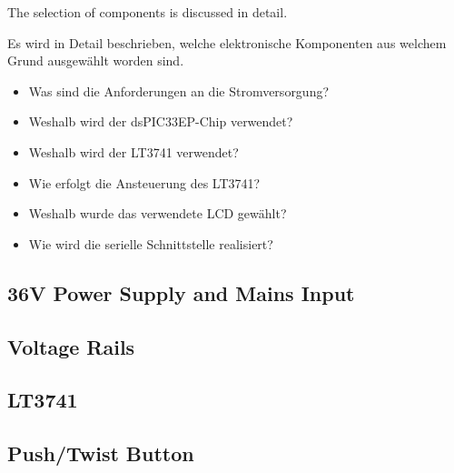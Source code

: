 The selection of components is discussed in detail.

Es wird  in  Detail  beschrieben,  welche  elektronische Komponenten aus welchem
Grund ausgew\"ahlt worden sind.

\begin{itemize}
    \item
        Was sind die Anforderungen an die Stromversorgung?
    \item
        Weshalb wird der dsPIC33EP-Chip verwendet?
    \item
        Weshalb wird der LT3741 verwendet?
    \item
        Wie erfolgt die Ansteuerung des LT3741?
    \item
        Weshalb wurde das verwendete LCD gew\"ahlt?
    \item
        Wie wird die serielle Schnittstelle realisiert?
\end{itemize}

\subsection{36V Power Supply and Mains Input}



\subsection{Voltage Rails}



\subsection{LT3741}



\subsection{Push/Twist Button}



